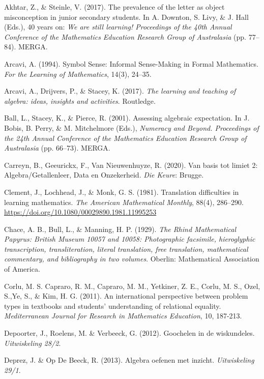 \begin{bronnen}
\small
\item Akhtar, Z., \& Steinle, V. (2017). The prevalence of the letter as object misconception in junior secondary students. In A. Downton, S. Livy, \& J. Hall (Eds.), 40 years on: \textit{We are still learning! Proceedings of the 40th Annual Conference of the Mathematics Education Research Group of Australasia} (pp. 77–84). MERGA.
\item Arcavi, A. (1994). Symbol Sense: Informal Sense-Making in Formal Mathematics. \textit{For the Learning of Mathematics}, 14(3), 24–35.
   \item Arcavi, A., Drijvers, P., \& Stacey, K. (2017). \textit{The learning and teaching of algebra: ideas, insights and activities}. Routledge.
   \item Ball, L., Stacey, K., \& Pierce, R. (2001). Assessing algebraic expectation. In J. Bobis, B. Perry, \& M. Mitchelmore (Eds.), \textit{Numeracy and Beyond. Proceedings of the 24th Annual Conference of the Mathematics Education Research Group of Australasia} (pp. 66–73). MERGA.
   \item Carreyn, B., Geeurickx, F., Van Nieuwenhuyze, R. (2020). Van basis tot limiet 2: Algebra/Getallenleer, Data en Onzekerheid. \textit{Die Keure}: Brugge.
   \item Clement, J., Lochhead, J., \& Monk, G. S. (1981). Translation difficulties in learning mathematics. \textit{The American Mathematical Monthly}, 88(4), 286–290. \url{https://doi.org/10.1080/00029890.1981.11995253}
   \item Chace, A. B., Bull, L., \& Manning, H. P. (1929). \textit{The Rhind Mathematical Papyrus: British Museum 10057 and 10058: Photographic facsimile, hieroglyphic transcription, transliteration, literal translation, free translation, mathematical commentary, and bibliography in two volumes}. Oberlin: Mathematical Association of America.
    \item Corlu, M. S. Capraro, R. M., Capraro, M. M., Yetkiner, Z. E., Corlu, M. S., Ozel, S.,Ye, S., \& Kim, H. G. (2011). An international perspective between problem types in textbooks and students’ understanding of relational equality.  \textit{Mediterranean Journal for Research in Mathematics Education}, 10, 187-213.
    \item Depoorter, J., Roelens, M. \& Verbeeck, G. (2012). Goochelen in de wiskundeles. \textit{Uitwiskeling 28/2}.
    \item Deprez, J. \& Op De Beeck, R. (2013). Algebra oefenen met inzicht. \textit{Uitwiskeling 29/1}.

\end{bronnen}

